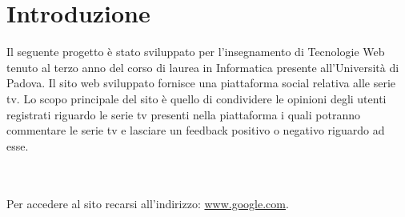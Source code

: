 \newpage
\section{Introduzione}
Il seguente progetto è stato sviluppato per l'insegnamento di Tecnologie Web tenuto al terzo anno del corso di laurea in Informatica presente all'Università di Padova. Il sito web sviluppato fornisce una piattaforma social relativa alle serie tv. Lo scopo principale del sito è quello di condividere le opinioni degli utenti registrati riguardo le serie tv presenti nella piattaforma i quali potranno commentare le serie tv e lasciare un feedback positivo o negativo riguardo ad esse. 

~\\ ~\\
Per accedere al sito recarsi all'indirizzo: \url{www.google.com}.~\\ ~\\

